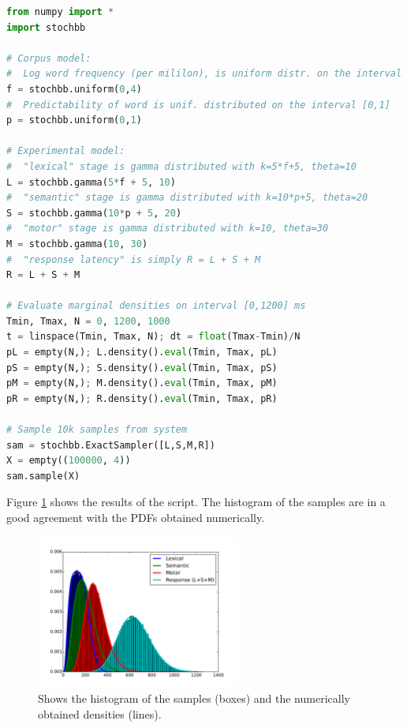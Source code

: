 \begin{lstlisting}[language=Python]
from numpy import *
import stochbb

# Corpus model:
#  Log word frequency (per mililon), is uniform distr. on the interval [0,4]
f = stochbb.uniform(0,4)
#  Predictability of word is unif. distributed on the interval [0,1]
p = stochbb.uniform(0,1)

# Experimental model:
#  "lexical" stage is gamma distributed with k=5*f+5, theta=10
L = stochbb.gamma(5*f + 5, 10)
#  "semantic" stage is gamma distributed with k=10*p+5, theta=20
S = stochbb.gamma(10*p + 5, 20)
#  "motor" stage is gamma distributed with k=10, theta=30
M = stochbb.gamma(10, 30)
#  "response latency" is simply R = L + S + M
R = L + S + M

# Evaluate marginal densities on interval [0,1200] ms
Tmin, Tmax, N = 0, 1200, 1000
t = linspace(Tmin, Tmax, N); dt = float(Tmax-Tmin)/N
pL = empty(N,); L.density().eval(Tmin, Tmax, pL)
pS = empty(N,); S.density().eval(Tmin, Tmax, pS)
pM = empty(N,); M.density().eval(Tmin, Tmax, pM)
pR = empty(N,); R.density().eval(Tmin, Tmax, pR)

# Sample 10k samples from system
sam = stochbb.ExactSampler([L,S,M,R])
X = empty((100000, 4))
sam.sample(X)
\end{lstlisting}

Figure \ref{fig:example} shows the results of the script. The histogram of the samples are in a good agreement with the PDFs obtained numerically. 

\begin{figure}[!ht]
 \centering
 \includegraphics[width=0.6\textwidth]{fig/example.pdf}
 \caption{Shows the histogram of the samples (boxes) and the numerically obtained densities (lines).} \label{fig:example}
\end{figure}
